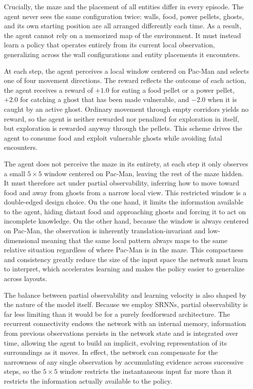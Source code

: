 Crucially, the maze and the placement of all entities differ in every episode. The agent never sees the same configuration twice: walls, food, power pellets, ghosts, and its own starting position are all arranged differently each time. As a result, the agent cannot rely on a memorized map of the environment. It must instead learn a policy that operates entirely from its current local observation, generalizing across the wall configurations and entity placements it encounters.

At each step, the agent perceives a local window centered on Pac-Man and selects one of four movement directions. The reward reflects the outcome of each action, the agent receives a reward of $+1.0$ for eating a food pellet or a power pellet, $+2.0$ for catching a ghost that has been made vulnerable, and $-2.0$ when it is caught by an active ghost. Ordinary movement through empty corridors yields no reward, so the agent is neither rewarded nor penalized for exploration in itself, but exploration is rewarded anyway through the pellets. This scheme drives the agent to consume food and exploit vulnerable ghosts while avoiding fatal encounters.

The agent does not perceive the maze in its entirety, at each step it only observes a small $5 \times 5$ window centered on Pac-Man, leaving the rest of the maze hidden. It must therefore act under partial observability, inferring how to move toward food and away from ghosts from a narrow local view. This restricted window is a double-edged design choice. On the one hand, it limits the information available to the agent, hiding distant food and approaching ghosts and forcing it to act on incomplete knowledge. On the other hand, because the window is always centered on Pac-Man, the observation is inherently translation-invariant and low-dimensional meaning that the same local pattern always maps to the same relative situation regardless of where Pac-Man is in the maze. This compactness and consistency greatly reduce the size of the input space the network must learn to interpret, which accelerates learning and makes the policy easier to generalize across layouts.

The balance between partial observability and learning velocity is also shaped by the nature of the model itself. Because we employ SRNNs, partial observability is far less limiting than it would be for a purely feedforward architecture. The recurrent connectivity endows the network with an internal memory, information from previous observations persists in the network state and is integrated over time, allowing the agent to build an implicit, evolving representation of its surroundings as it moves. In effect, the network can compensate for the narrowness of any single observation by accumulating evidence across successive steps, so the $5 \times 5$ window restricts the instantaneous input far more than it restricts the information actually available to the policy.

